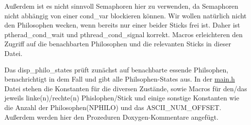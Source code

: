 Außerdem ist es nicht sinnvoll Semaphoren hier zu verwenden, da Semaphoren nicht abhängig von einer cond\-\_\-var blockieren können. Wir wollen natürlich nicht den Philosophen wecken, wenn bereits nur einer beider Sticks frei ist. Daher ist ptherad\-\_\-cond\-\_\-wait und pthread\-\_\-cond\-\_\-signal korrekt. Macros erleichteren den Zugriff auf die benachbarten Philosophen und die relevanten Sticks in dieser Datei.

Das disp\-\_\-philo\-\_\-states prüft zunächst auf benachbarte essende Philsophen, benachrichtigt in dem Fall und gibt alle Philsophen-\/\-States aus. In der \hyperlink{main_8h}{main.\-h} Datei stehen die Konstanten für die diversen Zustände, sowie Macros für den/das jeweils linke(n)/rechte(n) Phislophen/\-Stick und einige sonstige Konstanten wie die Anzahl der Philosophen(\-N\-P\-H\-I\-L\-O) und das A\-S\-C\-I\-I\-\_\-\-N\-U\-M\-\_\-\-O\-F\-F\-S\-E\-T. Außerdem werden hier den Prozeduren Doxygen-\/\-Kommentare angefügt.